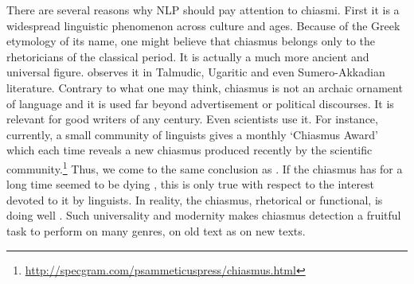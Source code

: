\documentclass[11pt]{article}
\begin{document}
There are several reasons why NLP should pay attention to chiasmi. 
First it is a widespread linguistic phenomenon across culture and ages.
Because of the Greek etymology of its name, one might believe that chiasmus belongs only to the rhetoricians of the classical period. It is actually a much more ancient and universal figure.  observes it in Talmudic,  Ugaritic and even Sumero-Akkadian literature.
Contrary to what one may think, chiasmus is not an archaic ornament of language and it is used far beyond advertisement or political discourses. It is relevant for good writers of any century. Even scientists use it. %
For instance, currently, a small community of linguists gives a monthly `Chiasmus Award' which each time reveals a new chiasmus produced recently by the scientific community.\footnote{\url{http://specgram.com/psammeticuspress/chiasmus.html}}
Thus, we come to the same conclusion as . 
If the chiasmus has for a long time seemed to be dying%
, this is only true with respect to the interest devoted to it by linguists. In reality, the chiasmus, rhetorical or functional, is doing well \cite{Nordahl1971}.
Such universality and modernity makes chiasmus detection a fruitful task to perform on many genres, on old text as on new texts.
\end{document}
